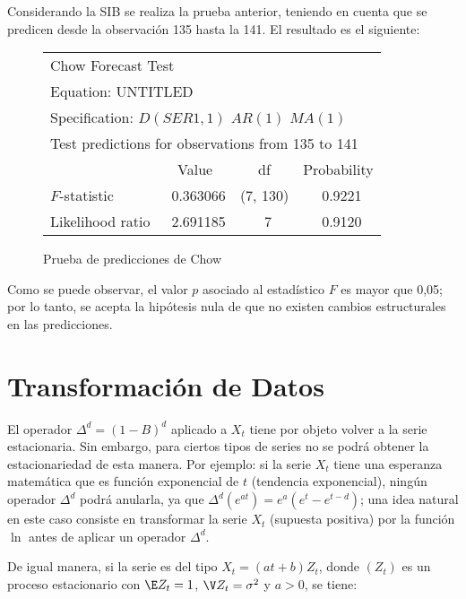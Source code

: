 \begin{ejemplo}
Considerando la SIB se realiza la prueba anterior, teniendo en cuenta que se predicen desde la observaci\'{o}n 135 hasta la 141. El resultado es el siguiente:

\begin{figure}[H]
\centering\small
\begin{tabular}{lccc}
\multicolumn{4}{l}{Chow Forecast Test}   \\
\multicolumn{4}{l}{Equation: UNTITLED} \\
\multicolumn{4}{l}{Specification: $D(SER1,1)$ $AR(1)$ $MA(1)$}   \\
\multicolumn{4}{l}{Test predictions for observations from 135 to 141} \\
\toprule
 & Value& df& Probability  \\
 \midrule
$F$-statistic& ~0.363066& (7, 130)& ~0.9221 \\
Likelihood ratio& ~2.691185& ~7& ~0.9120 \\
\bottomrule
\end{tabular}
\caption{Prueba de predicciones de Chow}
\end{figure}

Como se puede observar, el valor $p$ asociado al estad\'{i}stico $F$ es mayor que 0,05; por lo tanto, se acepta la hip\'{o}tesis nula de que no existen cambios estructurales en las predicciones.
\end{ejemplo}


\section{Transformaci\'{o}n de Datos}

El operador $\Delta^{d}= (1-B)^{d}$ aplicado a $X_{t} $ tiene por objeto volver a la serie estacionaria. Sin embargo, para ciertos tipos de series no se podr\'{a} obtener la estacionariedad de esta manera. Por ejemplo: si la serie $X_{t} $ tiene una esperanza matem\'{a}tica que es funci\'{o}n exponencial de $t$ (tendencia exponencial), ning\'{u}n operador $\Delta^{d}$ podr\'{a} anularla, ya que $\Delta^{d}\left( e^{at} \right)=e^{a}(e^{t}-e^{t-d})$; una idea natural en este caso consiste en transformar la serie $X_{t} $ (supuesta positiva) por la funci\'{o}n $\ln$  antes de aplicar un operador $\Delta^{d}$.\newline

De igual manera, si la serie es del tipo $X_{t}=(at +b)Z_{t}$, donde $(Z_{t})$ es un proceso estacionario con $\E Z_{t} = 1$, $\V Z_{t}= \sigma^{2}$ y $a> 0$, se tiene:

